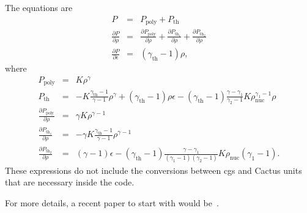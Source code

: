 The equations are
\begin{eqnarray}
  \label{eq:eosformulas}
  P & = & P_{\textrm{poly}} + P_{\textrm{th}} \\
  \frac{\partial P}{\partial \rho} & = & \frac{\partial
  P_{\textrm{poly}}}{\partial \rho} + \frac{\partial
  P_{\textrm{th}_1}}{\partial \rho} + \frac{\partial
  P_{\textrm{th}_2}}{\partial \rho}  \\
  \frac{\partial P}{\partial \epsilon} & = & (\gamma_{\textrm{th}} - 1)
  \rho,
\end{eqnarray}
where
\begin{eqnarray}
  \label{eq:eostemps}
  P_{\textrm{poly}} & = & K \rho^{\gamma} \\
  P_{\textrm{th}} & = & -K \frac{\gamma_{\textrm{th}} - 1}{\gamma - 1}
  \rho^{\gamma} + (\gamma_{\textrm{th}} - 1) \rho \epsilon -
  (\gamma_{\textrm{th}} - 1) \frac{\gamma - \gamma_1}{\gamma_2 - 1} K
  \rho_{\textrm{nuc}}^{\gamma_1 - 1} \rho \\
  \frac{\partial P_{\textrm{poly}}}{\partial \rho} & = & \gamma K
  \rho^{\gamma - 1} \\ 
  \frac{\partial P_{\textrm{th}_1}}{\partial \rho} & = & - \gamma K
  \frac{\gamma_{\textrm{th}} - 1}{\gamma - 1} \rho^{\gamma -1} \\ 
  \frac{\partial P_{\textrm{th}_2}}{\partial \rho} & = & (\gamma - 1)
  \epsilon - (\gamma_{\textrm{th}} - 1) \frac{\gamma -
  \gamma_1}{(\gamma_1 - 1)(\gamma_2 - 1)} K \rho_{\textrm{nuc}}
  (\gamma_1 - 1).
\end{eqnarray}
These expressions do not include the conversions between cgs and
Cactus units that are necessary inside the code.

For more details, a recent paper to start with would
be~\cite{Dimm05}. 





